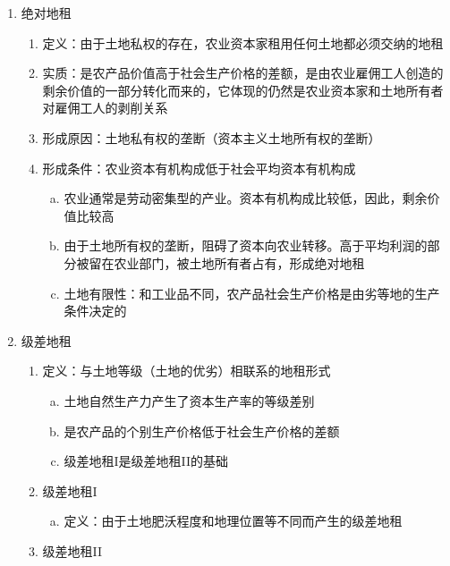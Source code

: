 \documentclass[12pt]{book}
\begin{document}
\begin{enumerate}[1.]
    \item 绝对地租
          \begin{enumerate}[(1)]
              \item 定义：由于土地私权的存在，农业资本家租用任何土地都必须交纳的地租
              \item 实质：是农产品价值高于社会生产价格的差额，是由农业雇佣工人创造的剩余价值的一部分转化而来的，它体现的仍然是农业资本家和土地所有者对雇佣工人的剥削关系
              \item 形成原因：土地私有权的垄断（资本主义土地所有权的垄断）
              \item 形成条件：农业资本有机构成低于社会平均资本有机构成
                    \begin{enumerate}[a.]
                        \item 农业通常是劳动密集型的产业。资本有机构成比较低，因此，剩余价值比较高
                        \item 由于土地所有权的垄断，阻碍了资本向农业转移。高于平均利润的部分被留在农业部门，被土地所有者占有，形成绝对地租
                        \item 土地有限性：和工业品不同，农产品社会生产价格是由劣等地的生产条件决定的
                    \end{enumerate}
          \end{enumerate}
    \item 级差地租
          \begin{enumerate}[(1)]
              \item 定义：与土地等级（土地的优劣）相联系的地租形式
                    \begin{enumerate}[a.]
                        \item 土地自然生产力产生了资本生产率的等级差别
                        \item 是农产品的个别生产价格低于社会生产价格的差额
                        \item 级差地租I是级差地租II的基础
                    \end{enumerate}
              \item 级差地租I
                    \begin{enumerate}[a.]
                        \item  定义：由于土地肥沃程度和地理位置等不同而产生的级差地租
                    \end{enumerate}
              \item 级差地租II
                    \begin{enumerate}[a.]

\end{enumerate}
\end{enumerate}
\end{enumerate}
\end{document}

